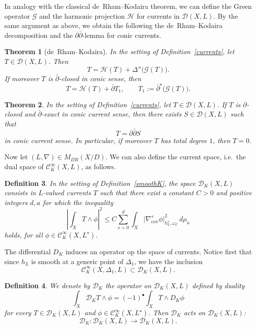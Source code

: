 \documentclass[english]{amsart}
\newcommand{\ddbar}{\partial\bar{\partial}}
\newcommand{\cC}{\mathcal{C}}
\newcommand{\cH}{\mathcal{H}}
\newcommand{\cG}{\mathcal{G}}
\renewcommand{\le}{\leqslant}
\newcommand{\dbar}{\bar \partial}
\newtheorem{thm}{Theorem}[section]
\newtheorem{defn}[thm]{Definition}
\numberwithin{equation}{thm}
\begin{document}
In analogy with the classical de~Rham--Kodaira theorem, we can define the Green operator $\cG$ and the harmonic projection $\cH$ for currents in $\mathcal{D}(X,L)$. By the same argument as above, we obtain the following the de~Rham--Kodaira decomposition and the $\ddbar$-lemma for conic currents.

\begin{thm}[de~Rham--Kodaira]\label{decompcurrentconic}
	In the setting of Definition~\ref{currents}, let $T\in \mathcal{D}(X,L)$. Then
	\[
	T = \cH(T) + \Delta''\bigl(\cG(T)\bigr).
	\]
	If moreover $T$ is $\dbar$-closed in conic sense, then
	\[
	T = \cH(T) + \dbar T_1,
	\qquad T_1 := \dbar^\star\bigl(\cG(T)\bigr).
	\]
\end{thm}

\begin{thm}\label{ddbarcurrentconic}
	In the setting of Definition~\ref{currents}, let $T\in \mathcal{D}(X,L)$.
	If $T$ is $\partial$-closed and $\dbar$-exact in conic current sense, then there exists $S\in \mathcal{D}(X,L)$ such that
	\[
	T = \ddbar S
	\]
	in conic current sense. In particular, if moreover $T$ has total degree $1$, then $T=0$.
\end{thm}

\medskip

Now let $(L,\nabla)\in M_{DR}(X/D)$. We can also define the current space, i.e.\ the dual space of $\cC^\infty_K(X,L)$, as follows.

\begin{defn}\label{currentsK}
	In the setting of Definition~\ref{smoothK}, the space $\mathcal{D}_K(X,L)$
	consists in $L$-valued currents $T$ such that there exist a constant $C>0$ and positive integers $d,a$ for which the inequality
	\begin{equation}\label{deck5K}
		\left|\int_X T\wedge \phi\right|^2
		\le C \sum_{s=0}^d \int_X \bigl|\nabla_{\mathrm{cov}}^s \phi\bigr|^2_{h_L^\star,\omega_{\cC}}\, d\mu_a
	\end{equation}
holds, for all $\phi \in \cC^\infty_K(X,L^\star)$.
\end{defn}

The differential $D_K$ induces an operator op the space of currents. Notice first that 
since $h_L$ is smooth at a generic point of $\Delta_1$,  we have the inclusion
	$$\cC^\infty_K(X,\Delta_1,L) \subset \mathcal{D}_K(X,L).$$
	
\begin{defn}\label{diffcurrents}	
We denote by $\mathcal{D}_K$ the operator on $\mathcal{D}_K(X,L)$ defined by duality 
	$$\int_X \mathcal{D}_K T \wedge \phi = (-1)^\bullet\int_XT \wedge D_K \phi $$
	for every $T\in \mathcal{D}_K(X,L)$ and $\phi \in \cC^\infty _K (X, L^\star)$. 
	Then $\mathcal{D}_K$ acts on $\mathcal{D}_K(X,L)$:
	\[
	\mathcal{D}_K:\mathcal{D}_K(X,L)\to \mathcal{D}_K(X,L).
	\]
\end{defn}
\end{document}
